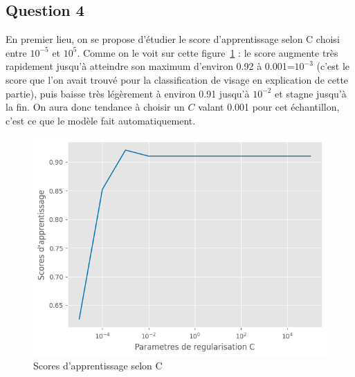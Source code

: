 \documentclass[11pt,a4paper]{article}
\begin{document}
\subsection*{Question 4}
En premier lieu, on se propose d'étudier le score d'apprentissage selon C choisi entre $10^{-5}$ et $10^{5}$. Comme on le voit sur cette figure~\ref{scores-selon-C} : le score augmente très rapidement jusqu'à atteindre son maximum d'environ 0.92 à 0.001=$10^{-3}$ (c'est le score que l'on avait trouvé pour la classification de visage en explication de cette partie), puis baisse très légèrement à environ 0.91 jusqu'à $10^{-2}$ et stagne jusqu'à la fin. On aura donc tendance à choisir un $C$ valant 0.001 pour cet échantillon, c'est ce que le modèle fait automatiquement.
\begin{figure}[H]
    \centering
    \includegraphics[width=0.6\linewidth]{scores d'apprentissage selon C.png}
    \caption{Scores d'apprentissage selon C}
    \label{scores-selon-C}
\end{figure}
\end{document}
